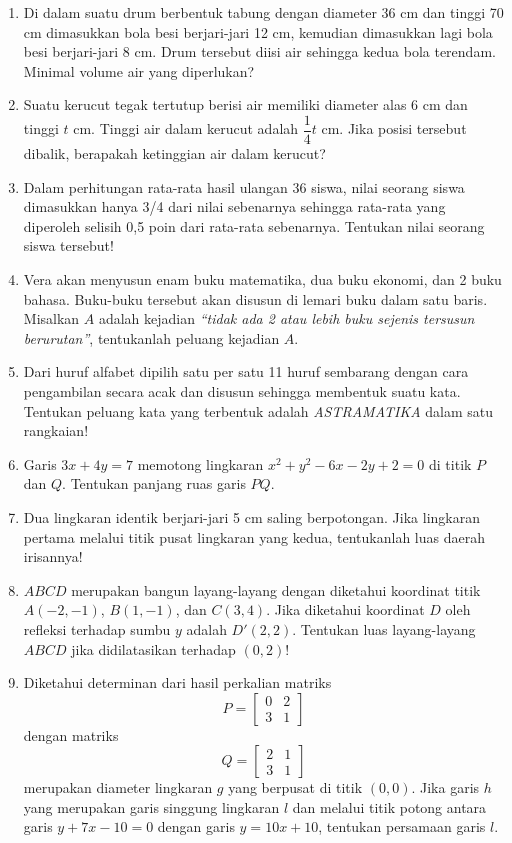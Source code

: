 \begin{enumerate}
\item Di dalam suatu drum berbentuk tabung dengan diameter 36 cm dan tinggi 70 cm dimasukkan bola besi berjari-jari 12 cm, kemudian dimasukkan lagi bola besi berjari-jari 8 cm. Drum tersebut diisi air sehingga kedua bola terendam. Minimal volume air yang diperlukan?

\item Suatu kerucut tegak tertutup berisi air memiliki diameter alas 6 cm dan tinggi $t$ cm. Tinggi air dalam kerucut adalah $\dfrac{1}{4}t$ cm. Jika posisi tersebut dibalik, berapakah ketinggian air dalam kerucut?

\item Dalam perhitungan rata-rata hasil ulangan 36 siswa, nilai seorang siswa dimasukkan hanya 3/4 dari nilai sebenarnya sehingga rata-rata yang diperoleh selisih 0,5 poin dari rata-rata sebenarnya. Tentukan nilai seorang siswa tersebut!

\item Vera akan menyusun enam buku matematika, dua buku ekonomi, dan 2 buku bahasa. Buku-buku tersebut akan disusun di lemari buku dalam satu baris. Misalkan $A$ adalah kejadian \emph{\sffamily``tidak ada 2 atau lebih buku sejenis tersusun berurutan''}, tentukanlah peluang kejadian $A$.

\item Dari huruf alfabet dipilih satu per satu 11 huruf sembarang dengan cara pengambilan secara acak dan disusun sehingga membentuk suatu kata. Tentukan peluang kata yang terbentuk adalah \emph{ASTRAMATIKA} dalam satu rangkaian!

\item Garis $3x+4y = 7$ memotong lingkaran $x^2+y^2-6x-2y+2=0$ di titik $P$ dan $Q$. Tentukan panjang ruas garis $PQ$.

\item Dua lingkaran identik berjari-jari 5 cm saling berpotongan. Jika lingkaran pertama melalui titik pusat lingkaran yang kedua, tentukanlah luas daerah irisannya!

\item $ABCD$ merupakan bangun layang-layang dengan diketahui koordinat titik $A(-2,-1)$, $B(1,-1)$, dan $C(3,4)$. Jika diketahui koordinat $D$ oleh refleksi terhadap sumbu $y$ adalah $D'(2,2)$. Tentukan luas layang-layang $ABCD$ jika didilatasikan terhadap $(0,2)$!

\item Diketahui determinan dari hasil perkalian matriks \[P=\begin{bmatrix}0&2\\3&1\end{bmatrix}\] dengan matriks \[Q=\begin{bmatrix}2&1\\3&1\end{bmatrix}\] merupakan diameter lingkaran $g$ yang berpusat di titik $(0,0)$. Jika garis $h$ yang merupakan garis singgung lingkaran $l$ dan melalui titik potong antara garis $y+7x-10=0$ dengan garis $y=10x+10$, tentukan persamaan garis $l$.


\end{enumerate}
